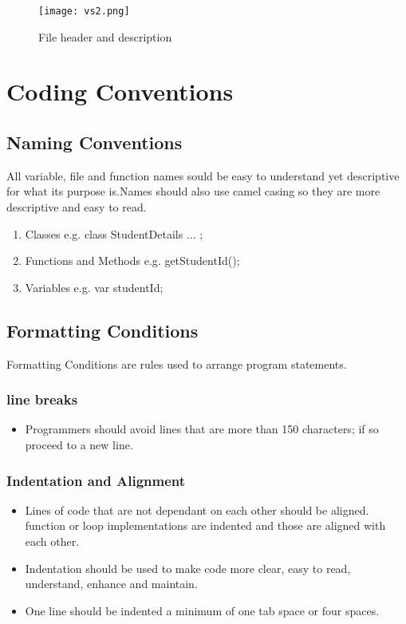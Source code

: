 \documentclass[12pt,a4paper]{article}
\begin{document}
	\begin{figure}[ht]
		 	\texttt{[image: vs2.png]}
		 	\caption{File header and description}
		 	\label{fig: File header}
		 \end{figure}
	
	\section{Coding Conventions}
	\subsection{Naming Conventions}
	All variable, file and function names sould be easy to understand yet descriptive for what its purpose is.Names should also use camel casing so they are more descriptive and easy to read.
	
	\begin{enumerate}
		\item Classes
			\newline e.g. class StudentDetails {...} ;
		\item Functions and Methods
			\newline e.g. getStudentId();
		\item Variables
			\newline e.g. var studentId;
	\end{enumerate}
	
	\subsection{Formatting Conditions}
	Formatting Conditions are rules used to arrange program statements.
	
	\subsubsection{line breaks}
	\begin{itemize}
	\item Programmers should  avoid lines that are more than 150 characters; if so proceed to a new line.
	\end{itemize}
	
	\subsubsection{Indentation and Alignment}
	\begin{itemize}
	\item Lines of code that are not dependant on each other should be aligned. function or loop implementations are indented and those are aligned with each other.
	\item Indentation should be used to make code more clear, easy to read, understand, enhance and maintain.
	\item One line should be indented a minimum of one tab space or  four spaces.
	\end{itemize}
	
\end{document}
